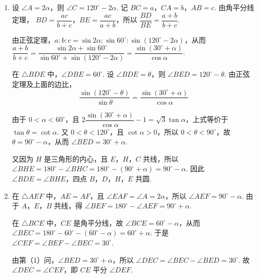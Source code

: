 \begin{solution}
\begin{enumerate}
\item 设 \(\angle A=2\alpha\)，则 \(\angle C=120^{\circ}-2\alpha\). 记 \(BC=a\)，\(CA=b\)，\(AB=c\). 由角平分线定理，
\(BD=\dfrac{ac}{b+c}\)，\(BE=\dfrac{ac}{a+b}\)，所以
\(\dfrac{BD}{BE}=\dfrac{a+b}{b+c}\).

由正弦定理，\(a:b:c=\sin2\alpha:\sin60^{\circ}:\sin(120^{\circ}-2\alpha)\)，从而
\(\dfrac{a+b}{b+c}=\dfrac{\sin2\alpha+\sin60^{\circ}}{\sin60^{\circ}+\sin(120^{\circ}-2\alpha)}=\dfrac{\sin(30^{\circ}+\alpha)}{\cos\alpha}\).

在 \(\triangle BDE\) 中，\(\angle DBE=60^{\circ}\). 设 \(\angle BDE=\theta\)，则 \(\angle BED=120^{\circ}-\theta\). 由正弦定理及上面的边比，
\[
\frac{\sin(120^{\circ}-\theta)}{\sin\theta}=\frac{\sin(30^{\circ}+\alpha)}{\cos\alpha}
\]

由于 \(0<\alpha<60^{\circ}\)，且
\(2\dfrac{\sin(30^{\circ}+\alpha)}{\cos\alpha}-1=\sqrt3\tan\alpha\)，上式等价于
\(\tan\theta=\cot\alpha\). 又 \(0<\theta<120^{\circ}\)，且 \(\cot\alpha>0\)，所以 \(0<\theta<90^{\circ}\)，故 \(\theta=90^{\circ}-\alpha\)，从而 \(\angle BED=30^{\circ}+\alpha\).

又因为 \(H\) 是三角形的内心，且 \(E\)，\(H\)，\(C\) 共线，所以
\(\angle BHE=180^{\circ}-\angle BHC=180^{\circ}-(90^{\circ}+\alpha)=90^{\circ}-\alpha\).
因此 \(\angle BDE=\angle BHE\)，四点 \(B\)，\(D\)，\(H\)，\(E\) 共圆.
\item 在 \(\triangle AEF\) 中，\(AE=AF\)，且 \(\angle EAF=\angle A=2\alpha\)，所以
\(\angle AEF=90^{\circ}-\alpha\). 由于 \(A\)，\(E\)，\(B\) 共线，得
\(\angle BEF=180^{\circ}-\angle AEF=90^{\circ}+\alpha\).

在 \(\triangle BCE\) 中，\(CE\) 是角平分线，故
\(\angle BCE=60^{\circ}-\alpha\)，从而
\(\angle BEC=180^{\circ}-60^{\circ}-(60^{\circ}-\alpha)=60^{\circ}+\alpha\). 于是
\(\angle CEF=\angle BEF-\angle BEC=30^{\circ}\).

由第（1）问，\(\angle BED=30^{\circ}+\alpha\)，所以
\(\angle DEC=\angle BEC-\angle BED=30^{\circ}\). 故 \(\angle DEC=\angle CEF\)，即 \(CE\) 平分 \(\angle DEF\).
\end{enumerate}
\end{solution}

